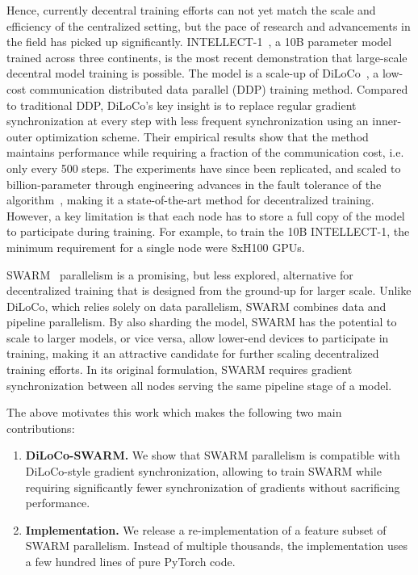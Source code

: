 \documentclass[conference, 10pt]{IEEEtran}
\begin{document}
Hence, currently decentral training efforts can not yet match the scale and
efficiency of the centralized setting, but the pace of research and advancements
in the field has picked up significantly. INTELLECT-1~\cite{intellect1}, a 10B
parameter model trained across three continents, is the most recent
demonstration that large-scale decentral model training is possible. The model
is a scale-up of DiLoCo~\cite{douillard2023}, a low-cost communication
distributed data parallel (DDP) training method. Compared to traditional DDP,
DiLoCo's key insight is to replace regular gradient synchronization at every
step with less frequent synchronization using an inner-outer optimization
scheme. Their empirical results show that the method maintains performance while
requiring a fraction of the communication cost, i.e. only every 500 steps.  The
experiments have since been replicated, and scaled to billion-parameter through
engineering advances in the fault tolerance of the
algorithm~\cite{jaghouar2024,intellect1}, making it a state-of-the-art method
for decentralized training. However, a key limitation is that each node has to
store a full copy of the model to participate during training. For example, to
train the 10B INTELLECT-1, the minimum requirement for a single node were 8xH100
GPUs.

SWARM~\cite{ryabinin2023} parallelism is a promising, but less explored,
alternative for decentralized training that is designed from the ground-up for
larger scale. Unlike DiLoCo, which relies solely on data parallelism, SWARM
combines data and pipeline parallelism. By also sharding the model, SWARM has
the potential to scale to larger models, or vice versa, allow lower-end devices
to participate in training, making it an attractive candidate for further
scaling decentralized training efforts. In its original formulation, SWARM
requires gradient synchronization between all nodes serving the same pipeline
stage of a model.

The above motivates this work which makes the following two main contributions:


\begin{enumerate}
  \item \textbf{DiLoCo-SWARM.} We show that SWARM parallelism is compatible with
  DiLoCo-style gradient synchronization, allowing to train SWARM while requiring 
  significantly fewer synchronization of gradients without sacrificing performance.
  \item \textbf{Implementation.} We release a re-implementation
  of a feature subset of SWARM parallelism. Instead of multiple thousands, the
  implementation uses a few hundred lines of pure PyTorch code.
\end{enumerate}
\end{document}

